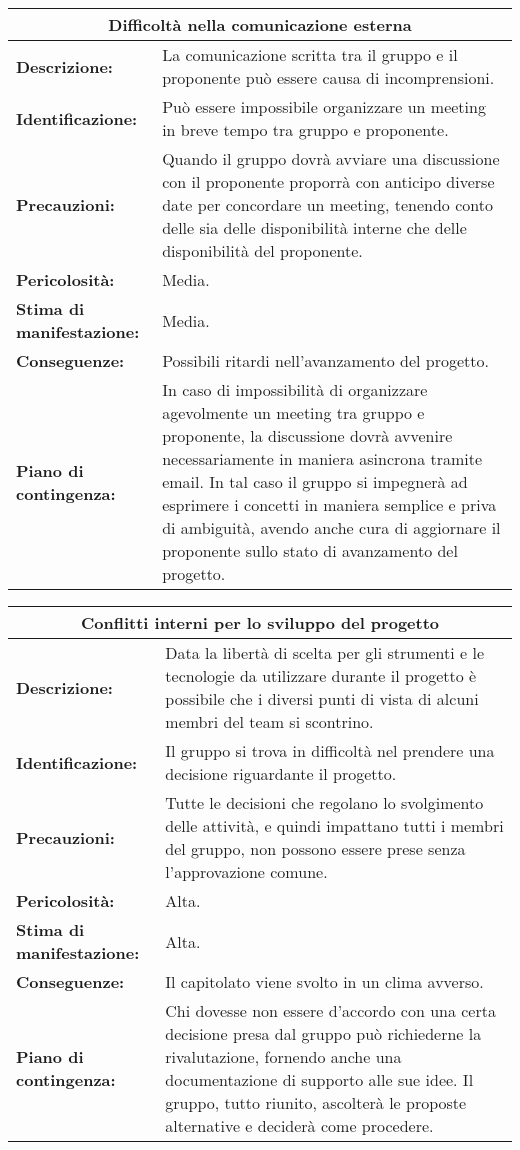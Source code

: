 \begin{tabularx}{\textwidth}{|X|X|}
\hline
\multicolumn{2}{|c|}{\textbf{Difficoltà nella comunicazione esterna}} \\
\hline
\textbf{Descrizione:}& La comunicazione scritta tra il gruppo e il proponente può essere causa di incomprensioni. \\
\hline
\textbf{Identificazione:}& Può essere impossibile organizzare un meeting in breve tempo tra gruppo e proponente. \\
\hline
\textbf{Precauzioni:}& Quando il gruppo dovrà avviare una discussione con il proponente proporrà con anticipo diverse date per concordare un meeting, tenendo conto delle sia delle disponibilità interne che delle disponibilità del proponente.\\
\hline
\textbf{Pericolosità:}& Media.\\
\hline
\textbf{Stima di manifestazione:}& Media.\\
\hline
\textbf{Conseguenze:}& Possibili ritardi nell'avanzamento del progetto.\\
\hline
\textbf{Piano di contingenza:}& In caso di impossibilità di organizzare agevolmente un meeting tra gruppo e proponente, la discussione dovrà avvenire necessariamente in maniera asincrona tramite email. In tal caso il gruppo si impegnerà ad esprimere i concetti in maniera semplice e priva di ambiguità, avendo anche cura di aggiornare il proponente sullo stato di avanzamento del progetto. \\
\hline
\end{tabularx}

\vspace{50pt}

\begin{tabularx}{\textwidth}{|X|X|}
\hline
\multicolumn{2}{|c|}{\textbf{Conflitti interni per lo sviluppo del progetto}} \\
\hline
\textbf{Descrizione:}& Data la libertà di scelta per gli strumenti e le tecnologie da utilizzare durante il progetto è possibile che i diversi punti di vista di alcuni membri del team si scontrino.\\
\hline
\textbf{Identificazione:}& Il gruppo si trova in difficoltà nel prendere una decisione riguardante il progetto.\\
\hline
\textbf{Precauzioni:}& Tutte le decisioni che regolano lo svolgimento delle attività, e quindi impattano tutti i membri del gruppo, non possono essere prese senza l'approvazione comune.\\
\hline
\textbf{Pericolosità:}& Alta.\\
\hline
\textbf{Stima di manifestazione:}& Alta.\\
\hline
\textbf{Conseguenze:}& Il capitolato viene svolto in un clima avverso.\\
\hline
\textbf{Piano di contingenza:}& Chi dovesse non essere d'accordo con una certa decisione presa dal gruppo può richiederne la rivalutazione, fornendo anche una documentazione di supporto alle sue idee. Il gruppo, tutto riunito, ascolterà le proposte alternative e deciderà come procedere.\\
\hline
\end{tabularx}

